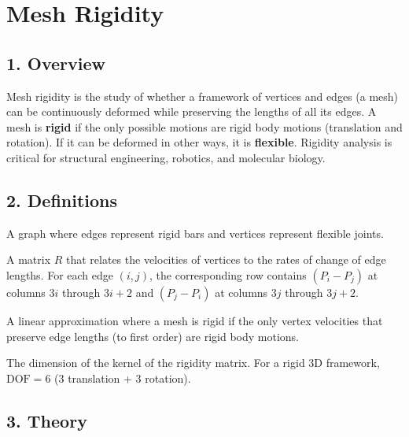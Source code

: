 \section{Mesh Rigidity}
\label{sec:mesh_rigidity}

\subsection{1. Overview}

Mesh rigidity is the study of whether a framework of vertices and edges (a mesh) can be continuously deformed while preserving the lengths of all its edges. A mesh is \textbf{rigid} if the only possible motions are rigid body motions (translation and rotation). If it can be deformed in other ways, it is \textbf{flexible}. Rigidity analysis is critical for structural engineering, robotics, and molecular biology.

\subsection{2. Definitions}

\begin{definition}\label{def:bar_joint}
A graph where edges represent rigid bars and vertices represent flexible joints.
\end{definition}

\begin{definition}\label{def:rigidity_matrix}
A matrix $R$ that relates the velocities of vertices to the rates of change of edge lengths. For each edge $(i,j)$, the corresponding row contains $(P_i - P_j)$ at columns $3i$ through $3i+2$ and $(P_j - P_i)$ at columns $3j$ through $3j+2$.
\end{definition}

\begin{definition}\label{def:infinitesimal_rigidity}
A linear approximation where a mesh is rigid if the only vertex velocities that preserve edge lengths (to first order) are rigid body motions.
\end{definition}

\begin{definition}\label{def:dof}
The dimension of the kernel of the rigidity matrix. For a rigid 3D framework, $\text{DOF} = 6$ (3 translation + 3 rotation).
\end{definition}

\subsection{3. Theory}

